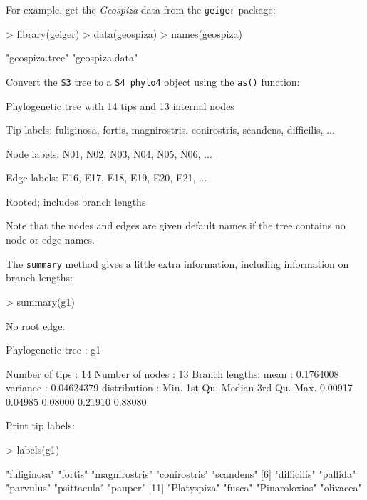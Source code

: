 \documentclass{article}
\newcommand{\code}[1]{{{\tt #1}}}
\begin{document}
For example, get the \emph{Geospiza} data from the \code{geiger} package:
\begin{Schunk}
\begin{Sinput}
> library(geiger)
> data(geospiza)
> names(geospiza)
\end{Sinput}
\begin{Soutput}
[1] "geospiza.tree" "geospiza.data"
\end{Soutput}
\end{Schunk}

Convert the \code{S3} tree to a \code{S4 phylo4} object using the \code{as()} function:
\begin{Schunk}
\begin{Soutput}
Phylogenetic tree with 14 tips and 13 internal nodes

Tip labels:
	fuliginosa, fortis, magnirostris, conirostris, scandens, difficilis, ...

Node labels:
	N01, N02, N03, N04, N05, N06, ...

Edge labels:
	E16, E17, E18, E19, E20, E21, ...

Rooted; includes branch lengths
\end{Soutput}
\end{Schunk}

Note that the nodes and edges are given default names if the tree contains no node or edge names.

The \code{summary} method gives a little extra information, including information on branch lengths:
\begin{Schunk}
\begin{Sinput}
> summary(g1)
\end{Sinput}
\begin{Soutput}
  No root edge.

 Phylogenetic tree : g1 

 Number of tips    : 14 
 Number of nodes   : 13 
 Branch lengths:
        mean         : 0.1764008 
        variance     : 0.04624379 
        distribution :
   Min. 1st Qu.  Median 3rd Qu.    Max. 
0.00917 0.04985 0.08000 0.21910 0.88080 
\end{Soutput}
\end{Schunk}

Print tip labels:
\begin{Schunk}
\begin{Sinput}
> labels(g1)
\end{Sinput}
\begin{Soutput}
 [1] "fuliginosa"   "fortis"       "magnirostris" "conirostris"  "scandens"    
 [6] "difficilis"   "pallida"      "parvulus"     "psittacula"   "pauper"      
[11] "Platyspiza"   "fusca"        "Pinaroloxias" "olivacea"    
\end{Soutput}
\end{Schunk}
\end{document}
